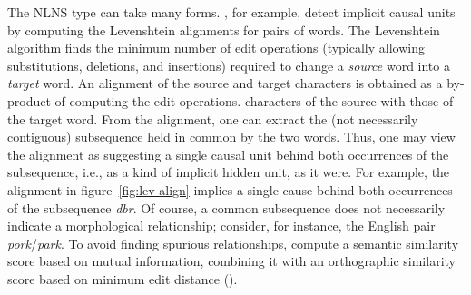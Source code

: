 The NLNS type can take many forms. 
\cite{baroni-et-al:2002}, for example, detect implicit causal units by computing 
the Levenshtein alignments for pairs of words. 
The Levenshtein algorithm finds the minimum number of edit operations 
(typically allowing substitutions, deletions, and insertions) required to change 
a \textit{source} word into a \textit{target} word.
An alignment of the source and target characters is obtained as a by-product 
of computing the edit operations.
characters of the source with those of the target word. 
From the alignment, one can extract the (not necessarily contiguous) 
subsequence held in common by the two words.
Thus, one may view the alignment as suggesting a single causal unit behind 
both occurrences of the subsequence, i.e., as a kind of implicit hidden unit, 
as it were.
For example, the alignment in figure~\ref{fig:lev-align} implies a single cause 
behind both occurrences of the subsequence \textit{dbr}.
Of course, a common subsequence does not necessarily indicate a 
morphological relationship; 
consider, for instance, the English pair \textit{pork}/\textit{park}. 
To avoid finding spurious relationships, 
\cite{baroni-et-al:2002} compute a semantic similarity score based on 
mutual information, 
combining it with an orthographic similarity score based on minimum 
edit distance ().

